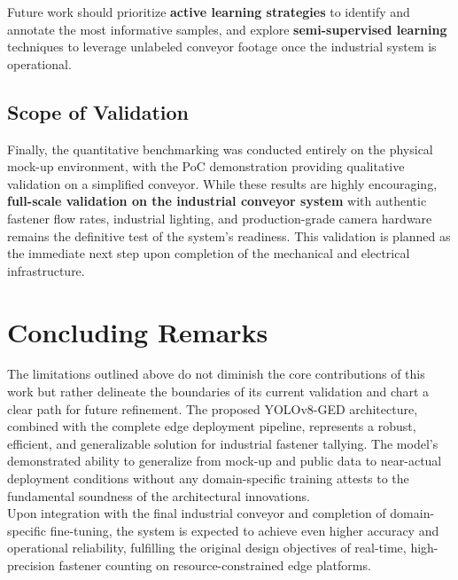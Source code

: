 Future work should prioritize \textbf{active learning strategies} to identify and annotate the most informative samples, and explore \textbf{semi-supervised learning} techniques to leverage unlabeled conveyor footage once the industrial system is operational.

\subsection{Scope of Validation}

Finally, the quantitative benchmarking was conducted entirely on the physical mock-up environment, with the PoC demonstration providing qualitative validation on a simplified conveyor. While these results are highly encouraging, \textbf{full-scale validation on the industrial conveyor system} with authentic fastener flow rates, industrial lighting, and production-grade camera hardware remains the definitive test of the system's readiness. This validation is planned as the immediate next step upon completion of the mechanical and electrical infrastructure.\\

\section{Concluding Remarks}

The limitations outlined above do not diminish the core contributions of this work but rather delineate the boundaries of its current validation and chart a clear path for future refinement. The proposed YOLOv8-GED architecture, combined with the complete edge deployment pipeline, represents a robust, efficient, and generalizable solution for industrial fastener tallying. The model's demonstrated ability to generalize from mock-up and public data to near-actual deployment conditions without any domain-specific training attests to the fundamental soundness of the architectural innovations.\\

Upon integration with the final industrial conveyor and completion of domain-specific fine-tuning, the system is expected to achieve even higher accuracy and operational reliability, fulfilling the original design objectives of real-time, high-precision fastener counting on resource-constrained edge platforms.